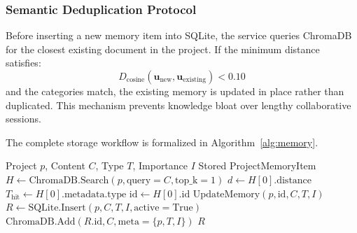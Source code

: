 \documentclass[conference]{IEEEtran}
\begin{document}
\subsubsection{Semantic Deduplication Protocol}
Before inserting a new memory item into SQLite, the service queries ChromaDB for the closest existing document in the project. If the minimum distance satisfies:
\begin{equation}
D_{\text{cosine}}(\mathbf{u}_{\text{new}}, \mathbf{u}_{\text{existing}}) < 0.10
\end{equation}
and the categories match, the existing memory is updated in place rather than duplicated. This mechanism prevents knowledge bloat over lengthy collaborative sessions.

The complete storage workflow is formalized in Algorithm~\ref{alg:memory}.

\begin{algorithm}[!t]
\caption{Dual-Tier Memory Storage \& Deduplication}
\label{alg:memory}
\begin{algorithmic}[1]
\REQUIRE Project $p$, Content $C$, Type $T$, Importance $I$
\ENSURE Stored \textsf{ProjectMemoryItem}
\STATE $H \leftarrow \text{ChromaDB.Search}(p, \text{query}=C, \text{top\_k}=1)$
    \STATE $d \leftarrow H[0].\text{distance}$
    \STATE $T_{\text{hit}} \leftarrow H[0].\text{metadata.type}$
        \STATE $\text{id} \leftarrow H[0].\text{id}$
        \RETURN $\text{UpdateMemory}(p, \text{id}, C, T, I)$
    \ENDIF
\ENDIF
\STATE $R \leftarrow \text{SQLite.Insert}(p, C, T, I, \text{active}=\text{True})$
\STATE $\text{ChromaDB.Add}(R.\text{id}, C, \text{meta}=\{p, T, I\})$
\RETURN $R$
\end{algorithmic}
\end{algorithm}
\end{document}
